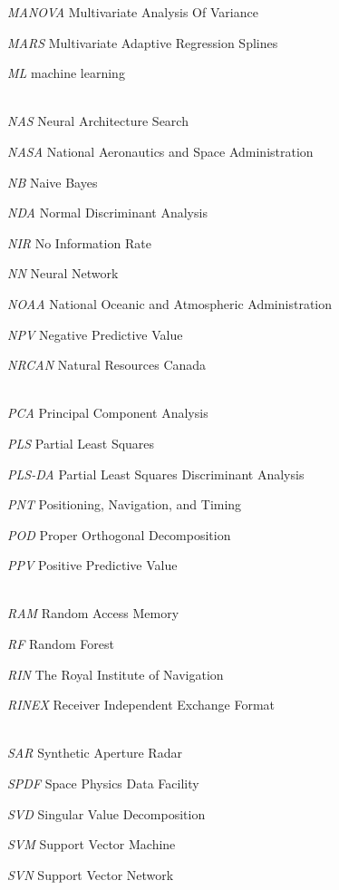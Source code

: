 \let\LaTeXcline\cline\documentclass[sn-mathphys-num]{sn-jnl}\let\cline\LaTeXcline
\begin{document}
\textit{MANOVA} Multivariate Analysis Of Variance

\textit{MARS} Multivariate Adaptive Regression Splines

\textit{ML} machine learning


\\[2\baselineskip]

\textit{NAS} Neural Architecture Search

\textit{NASA} National Aeronautics and Space Administration

\textit{NB} Naive Bayes

\textit{NDA} Normal Discriminant Analysis

\textit{NIR} No Information Rate

\textit{NN} Neural Network

\textit{NOAA} National Oceanic and Atmospheric Administration

\textit{NPV} Negative Predictive Value

\textit{NRCAN} Natural Resources Canada


\\[2\baselineskip]

\textit{PCA} Principal Component Analysis

\textit{PLS} Partial Least Squares

\textit{PLS-DA} Partial Least Squares Discriminant Analysis

\textit{PNT} Positioning, Navigation, and Timing

\textit{POD} Proper Orthogonal Decomposition

\textit{PPV} Positive Predictive Value


\\[2\baselineskip]

\textit{RAM} Random Access Memory

\textit{RF} Random Forest

\textit{RIN} The Royal Institute of Navigation

\textit{RINEX} Receiver Independent Exchange Format


\\[2\baselineskip]

\textit{SAR} Synthetic Aperture Radar

\textit{SPDF} Space Physics Data Facility

\textit{SVD} Singular Value Decomposition

\textit{SVM} Support Vector Machine

\textit{SVN} Support Vector Network
\end{document}
